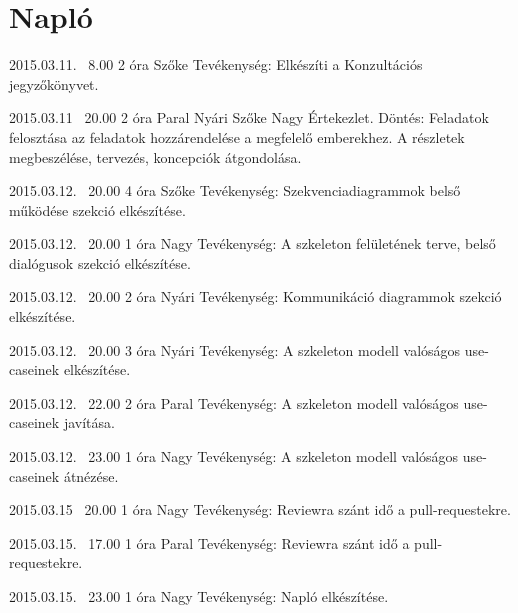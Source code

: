 %
\section{Napló}

\begin{naplo}
	
	\bejegyzes
	{2015.03.11. ~8.00}
	{2 óra}
    {Szőke} 
	{Tevékenység: Elkészíti a Konzultációs jegyzőkönyvet.\newline } 
	
	\bejegyzes
	{2015.03.11 ~20.00}
	{2 óra}
	{Paral \newline Nyári \newline Szőke \newline Nagy} 
	{Értekezlet.
		Döntés: Feladatok felosztása az feladatok hozzárendelése a megfelelő emberekhez. A részletek megbeszélése, tervezés, koncepciók átgondolása.\newline } 
			
	
	\bejegyzes
	{2015.03.12. ~20.00}
	{4 óra}
	{Szőke} 
	{Tevékenység: Szekvenciadiagrammok belső működése szekció elkészítése.\newline } 
		
	\bejegyzes
	{2015.03.12. ~20.00}
	{1 óra}
	{Nagy} 
	{Tevékenység: A szkeleton felületének terve, belső dialógusok szekció elkészítése.\newline } 
		
    	
	\bejegyzes
	{2015.03.12. ~20.00}
	{2 óra}
	{Nyári} 
	{Tevékenység: Kommunikáció diagrammok szekció elkészítése.\newline } 
		
    
    \bejegyzes
    {2015.03.12. ~20.00}
    {3 óra}
    {Nyári} 
    {Tevékenység: A szkeleton modell valóságos use-caseinek elkészítése.\newline } 
        
    \bejegyzes
    {2015.03.12. ~22.00}
    {2 óra}
    {Paral} 
    {Tevékenység: A szkeleton modell valóságos use-caseinek javítása.\newline } 

    \bejegyzes
    {2015.03.12. ~23.00}
    {1 óra}
    {Nagy} 
    {Tevékenység: A szkeleton modell valóságos use-caseinek átnézése.\newline } 

    \bejegyzes
	{2015.03.15 ~20.00}
	{1 óra}
	{Nagy} 
	{Tevékenység: Reviewra szánt idő a pull-requestekre.\newline } 
	
	\bejegyzes
	{2015.03.15. ~17.00}
	{1 óra}
	{Paral} 
	{Tevékenység: Reviewra szánt idő a pull-requestekre.\newline } 
			
	\bejegyzes
	{2015.03.15. ~23.00}
	{1 óra}
	{Nagy} 
	{Tevékenység: Napló elkészítése.\newline } 
	
\end{naplo}



